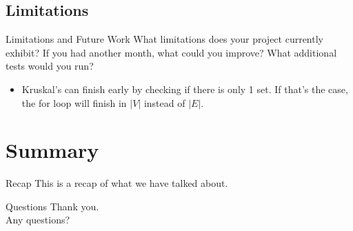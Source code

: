 \documentclass{beamer}
\begin{document}

\subsection{Limitations}
\begin{frame}{Limitations and Future Work}
    What limitations does your project currently exhibit? If you had another
    month, what could you improve? What additional tests would you run?

    \begin{itemize}
    \item Kruskal's can finish early by checking if there is only 1 set. If
    that's the case, the for loop will finish in $|V|$ instead of $|E|$.
    \end{itemize}
\end{frame}


\section{Summary}\frame{\sectionpage}
\begin{frame}{Recap}
    This is a recap of what we have talked about.
\end{frame}

\begin{frame}{Questions}
    Thank you.\\
    Any questions?
\end{frame}
\end{document}
